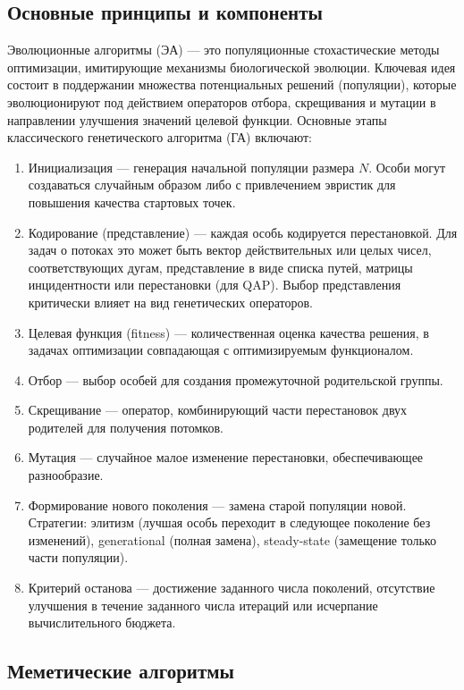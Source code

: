 \documentclass[732]{studrep}
\theoremstyle{nonumberplain}
\begin{document}
\subsection{Основные принципы и компоненты}

Эволюционные алгоритмы (ЭА) — это популяционные стохастические методы оптимизации, имитирующие механизмы биологической эволюции. Ключевая идея состоит в поддержании множества потенциальных решений (популяции), которые эволюционируют под действием операторов отбора, скрещивания и мутации в направлении улучшения значений целевой функции. Основные этапы классического генетического алгоритма (ГА) включают:
\begin{enumerate}
\item Инициализация — генерация начальной популяции размера $N$. Особи могут создаваться случайным образом либо с привлечением эвристик для повышения качества стартовых точек.
\item Кодирование (представление) — каждая особь кодируется перестановкой. Для задач о потоках это может быть вектор действительных или целых чисел, соответствующих дугам, представление в виде списка путей, матрицы инцидентности или перестановки (для QAP). Выбор представления критически влияет на вид генетических операторов.
\item Целевая функция (fitness) — количественная оценка качества решения, в задачах оптимизации совпадающая с оптимизируемым функционалом.
\item Отбор — выбор особей для создания промежуточной родительской группы.
\item Скрещивание — оператор, комбинирующий части перестановок двух родителей для получения потомков.
\item Мутация — случайное малое изменение перестановки, обеспечивающее разнообразие.
\item Формирование нового поколения — замена старой популяции новой. Стратегии: элитизм (лучшая особь переходит в следующее поколение без изменений), generational (полная замена), steady-state (замещение только части популяции).
\item Критерий останова — достижение заданного числа поколений, отсутствие улучшения в течение заданного числа итераций или исчерпание вычислительного бюджета.
\end{enumerate}

\subsection{Меметические алгоритмы}
\end{document}
